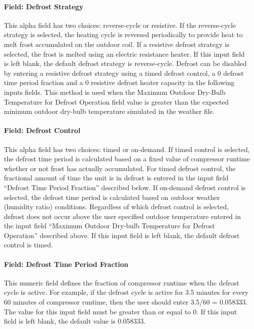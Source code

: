 \paragraph{Field: Defrost Strategy}\label{field-defrost-strategy-000}

This alpha field has two choices: reverse-cycle or resistive. If the reverse-cycle strategy is selected, the heating cycle is reversed periodically to provide heat to melt frost accumulated on the outdoor coil. If a resistive defrost strategy is selected, the frost is melted using an electric resistance heater. If this input field is left blank, the default defrost strategy is reverse-cycle. Defrost can be disabled by entering a resistive defrost strategy using a timed defrost control, a 0 defrost time period fraction and a 0 resistive defrost heater capacity in the following inputs fields. This method is used when the Maximum Outdoor Dry-Bulb Temperature for Defrost Operation field value is greater than the expected minimum outdoor dry-bulb temperature simulated in the weather file.

\paragraph{Field: Defrost Control}\label{field-defrost-control-000}

This alpha field has two choices: timed or on-demand. If timed control is selected, the defrost time period is calculated based on a fixed value of compressor runtime whether or not frost has actually accumulated. For timed defrost control, the fractional amount of time the unit is in defrost is entered in the input field ``Defrost Time Period Fraction'' described below. If on-demand defrost control is selected, the defrost time period is calculated based on outdoor weather (humidity ratio) conditions. Regardless of which defrost control is selected, defrost does not occur above the user specified outdoor temperature entered in the input field ``Maximum Outdoor Dry-bulb Temperature for Defrost Operation'' described above. If this input field is left blank, the default defrost control is timed.

\paragraph{Field: Defrost Time Period Fraction}\label{field-defrost-time-period-fraction-000}

This numeric field defines the fraction of compressor runtime when the defrost cycle is active. For example, if the defrost cycle is active for 3.5 minutes for every 60 minutes of compressor runtime, then the user should enter 3.5/60 = 0.058333. The value for this input field must be greater than or equal to 0. If this input field is left blank, the default value is 0.058333.

